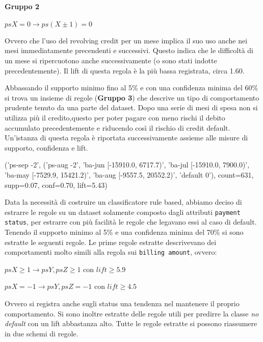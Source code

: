 \paragraph{Gruppo 2}
\begin{center}
	$psX =0 \rightarrow ps(X \pm 1) = 0$
\end{center}

Ovvero che l'uso del revolving credit per un mese implica il suo uso anche nei mesi
immediatamente precendenti e successivi. Questo indica che le difficolt\`a di un
mese si ripercuotono anche successivamente (o sono stati indotte precedentemente).
Il lift di questa regola \`e la pi\`u bassa registrata, circa 1.60.

Abbassando il supporto minimo fino al 5\% e con una confidenza minima del 60\% si trova un
insieme di regole (\textbf{Gruppo 3}) che descrive un tipo di comportamento prudente
tenuto da una parte del dataset. Dopo una serie di mesi di spesa non si utilizza
pi\`u il credito,questo per poter pagare con meno rischi il debito accumulato
precedentemente e riducendo così il rischio di credit default.
Un'istanza di questa regola \`e riportata successivamente assieme alle misure di
supporto, confidenza e lift.

\begin{center}
	('ps-sep -2', ('ps-aug -2', 'ba-jun [-15910.0, 6717.7)', 'ba-jul [-15910.0, 7900.0)', 'ba-may [-7529.9, 15421.2)', 'ba-aug [-9557.5, 20552.2)', 'default 0'), count=631, supp=0.07, conf=0.70, lift=5.43)
\end{center}

Data la necessit\`a di costruire un classificatore rule based, abbiamo deciso
di estrarre le regole su un dataset solamente composto dagli attributi
\texttt{payment status}, per estrarre con pi\`u facilit\`a le regole che legavano
essi al caso di default. Tenendo il supporto minimo al 5\% e una confidenza minima del 70\% si
sono estratte le seguenti regole. 
Le prime regole estratte descrivevano dei comportamenti molto simili alla regola
sui \texttt{billing amount}, ovvero:

\begin{center}
	$psX \geq 1 \rightarrow psY, psZ \geq 1$ con $lift \geq 5.9$
	
	$psX = -1 \rightarrow psY, psZ = -1$ con $lift \geq 4.5$
\end{center}

Ovvero si registra anche sugli status una tendenza nel mantenere il proprio
comportamento. Si sono inoltre estratte delle regole utili per predirre
la classe \textit{no default} con un lift abbastanza alto. Tutte le regole
estratte si possono riassumere in due schemi di regole.

